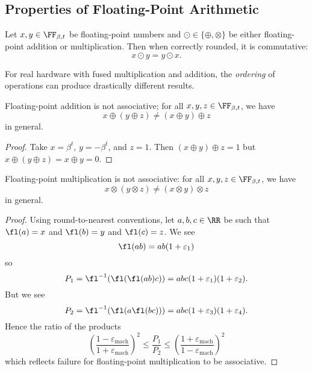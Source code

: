 \subsection{Properties of Floating-Point Arithmetic}
\begin{thm}
  Let $x,y\in\FF_{\beta,t}$ be floating-point numbers and
  $\odot\in\{\oplus,\otimes\}$ be either floating-point addition or
  multiplication. Then when correctly rounded, it is commutative:
  \begin{equation}
    x\odot y = y\odot x.
  \end{equation}
\end{thm}
\begin{rmk}
For real hardware with fused multiplication and addition, the
\emph{ordering} of operations can produce drastically different results.
\end{rmk}
\begin{thm}
  Floating-point addition is not associative;
  for all $x,y,z\in\FF_{\beta,t}$, we have
  $$x\oplus(y\oplus z) \neq (x\oplus y)\oplus z$$
  in general.
\end{thm}
\begin{proof}
  Take $x=\beta^{t}$, $y=-\beta^{t}$, and $z=1$. Then $(x\oplus y)\oplus z=1$
  but $x\oplus(y\oplus z)=x\oplus y=0$.
\end{proof}
\begin{thm}
  Floating-point multiplication is not associative:
  for all $x,y,z\in\FF_{\beta,t}$, we have
  $$x\otimes(y\otimes z) \neq (x\otimes y)\otimes z$$
  in general.
\end{thm}
\begin{proof}
  Using round-to-nearest conventions, let $a,b,c\in\RR$ be such that
  $\fl(a)=x$ and $\fl(b)=y$ and $\fl(c)=z$. We see
  \begin{equation}
    \fl(ab) = ab(1 + \varepsilon_{1})
  \end{equation}
  so
  \begin{equation}
    P_{1}=\fl^{-1}(\fl(\fl(ab)c)) = abc(1+\varepsilon_{1})(1 + \varepsilon_{2}).
  \end{equation}
  But we see
  \begin{equation}
    P_{2}=\fl^{-1}(\fl(a\fl(bc))) = abc(1+\varepsilon_{3})(1 + \varepsilon_{4}).
  \end{equation}
  Hence the ratio of the products
  \begin{equation}
    \left(\frac{1 - \varepsilon_{\text{mach}}}{1 + \varepsilon_{\text{mach}}}\right)^{2}\leq\frac{P_{1}}{P_{2}}\leq\left(\frac{1 + \varepsilon_{\text{mach}}}{1 - \varepsilon_{\text{mach}}}\right)^{2}
  \end{equation}
  which reflects failure for floating-point multiplication to be associative.
\end{proof}